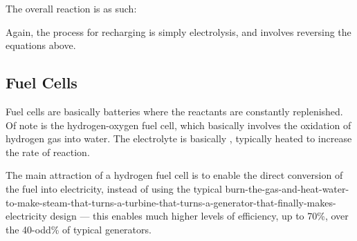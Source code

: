 				The overall reaction is as such:


				Again, the process for recharging is simply electrolysis, and involves reversing the equations above.






		\pagebreak
		\subsection{Fuel Cells}

			Fuel cells are basically batteries where the reactants are constantly replenished. Of note is the hydrogen-oxygen fuel cell,
			which basically involves the oxidation of hydrogen gas into water. The electrolyte is basically , typically heated
			to increase the rate of reaction.

			The main attraction of a hydrogen fuel cell is to enable the direct conversion of the  fuel into electricity, instead
			of using the typical burn-the-gas-and-heat-water-to-make-steam-that-turns-a-turbine-that-turns-a-generator-that-finally-makes-electricity design --- this enables much higher levels of efficiency, up to 70\%, over the 40-odd\% of typical generators.


